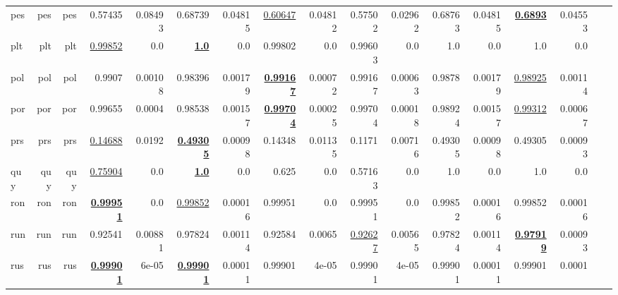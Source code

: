 \documentclass[11pt]{article}
\begin{document}
\begin{table*}[h]
{\begin{tabular}{lrrrrrrrrrrrrrrrr}
pes         & pes         & pes         & 0.57435         & 0.08493         & 0.68739         & 0.04815         & \underline{0.60647}         & 0.04812         & 0.57502         & 0.02962         & 0.68763         & 0.04815         & \textbf{\underline{0.6893}}         & 0.04553         \\
plt         & plt         & plt         & \underline{0.99852}         & 0.0         & \textbf{\underline{1.0}}         & 0.0         & 0.99802         & 0.0         & 0.99603         & 0.0         & 1.0         & 0.0         & 1.0         & 0.0         \\
pol         & pol         & pol         & 0.9907         & 0.00108         & 0.98396         & 0.00179         & \textbf{\underline{0.99167}}         & 0.00072         & 0.99167         & 0.00063         & 0.9878         & 0.00179         & \underline{0.98925}         & 0.00114         \\
por         & por         & por         & 0.99655         & 0.0004         & 0.98538         & 0.00157         & \textbf{\underline{0.99704}}         & 0.00025         & 0.99704         & 0.00018         & 0.98924         & 0.00157         & \underline{0.99312}         & 0.00067         \\
prs         & prs         & prs         & \underline{0.14688}         & 0.0192         & \textbf{\underline{0.49305}}         & 0.00098         & 0.14348         & 0.01135         & 0.1171         & 0.00716         & 0.49305         & 0.00098         & 0.49305         & 0.00093         \\
quy         & quy         & quy         & \underline{0.75904}         & 0.0         & \textbf{\underline{1.0}}         & 0.0         & 0.625         & 0.0         & 0.57163         & 0.0         & 1.0         & 0.0         & 1.0         & 0.0         \\
ron         & ron         & ron         & \textbf{\underline{0.99951}}         & 0.0         & \underline{0.99852}         & 0.00016         & 0.99951         & 0.0         & 0.99951         & 0.0         & 0.99852         & 0.00016         & 0.99852         & 0.00016         \\
run         & run         & run         & 0.92541         & 0.00881         & 0.97824         & 0.00114         & 0.92584         & 0.0065         & \underline{0.92627}         & 0.00565         & 0.97824         & 0.00114         & \textbf{\underline{0.97919}}         & 0.00093         \\
rus         & rus         & rus         & \textbf{\underline{0.99901}}         & 6e-05         & \textbf{\underline{0.99901}}         & 0.00011         & 0.99901         & 4e-05         & 0.99901         & 4e-05         & 0.99901         & 0.00011         & 0.99901         & 0.0001         \\

\end{tabular}}
\end{table*}
\end{document}
